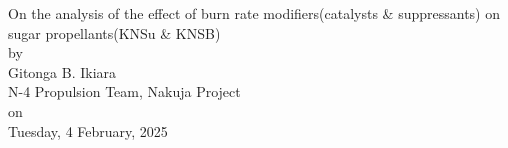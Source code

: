 \documentclass[12pt,letterpaper]{article}
\begin{document}
	\begin{center}
		\huge{On the analysis of the effect of burn rate modifiers(catalysts \& suppressants) on sugar propellants(KNSu \& KNSB)} \\
		by \\
		\Large{Gitonga B. Ikiara} \\
		\large{N-4 Propulsion Team, Nakuja Project} \\
		on \\
		\large{Tuesday, 4 February, 2025} \\
	\end{center}

	
	
	
	
	\appendix
	
	
\end{document}
